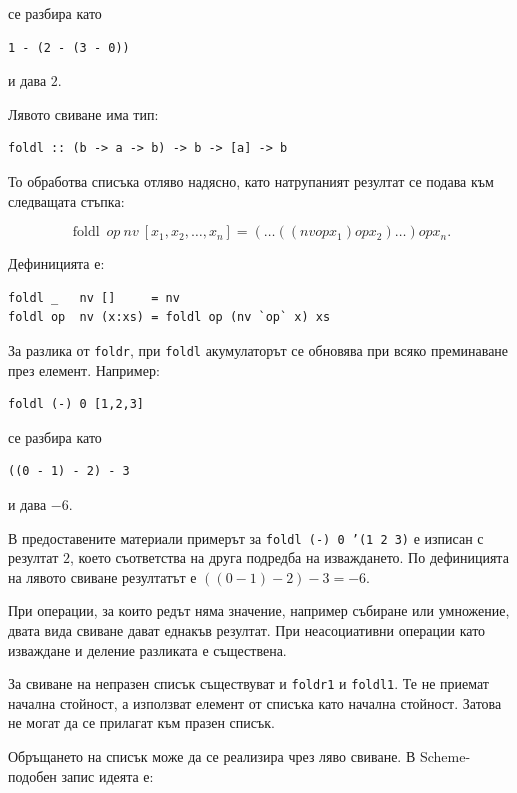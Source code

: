 се разбира като

\begin{verbatim}
1 - (2 - (3 - 0))
\end{verbatim}

и дава $2$.

Лявото свиване има тип:

\begin{verbatim}
foldl :: (b -> a -> b) -> b -> [a] -> b
\end{verbatim}

То обработва списъка отляво надясно, като натрупаният резултат се подава към следващата стъпка:

\[
\operatorname{foldl}\ op\ nv\ [x_1,x_2,\ldots,x_n]
=
(\ldots((nv\mathbin{op}x_1)\mathbin{op}x_2)
\ldots)\mathbin{op}x_n.
\]

Дефиницията е:

\begin{verbatim}
foldl _   nv []     = nv
foldl op  nv (x:xs) = foldl op (nv `op` x) xs
\end{verbatim}

За разлика от \texttt{foldr}, при \texttt{foldl} акумулаторът се обновява при всяко преминаване през елемент. Например:

\begin{verbatim}
foldl (-) 0 [1,2,3]
\end{verbatim}

се разбира като

\begin{verbatim}
((0 - 1) - 2) - 3
\end{verbatim}

и дава $-6$.

\begin{supp}[Бележка]
В предоставените материали примерът за \texttt{foldl (-) 0 '(1 2 3)} е изписан с резултат $2$, което съответства на друга подредба на изваждането. По дефиницията на лявото свиване резултатът е $((0-1)-2)-3=-6$.
\end{supp}

При операции, за които редът няма значение, например събиране или умножение, двата вида свиване дават еднакъв резултат. При неасоциативни операции като изваждане и деление разликата е съществена.

За свиване на непразен списък съществуват и \texttt{foldr1} и \texttt{foldl1}. Те не приемат начална стойност, а използват елемент от списъка като начална стойност. Затова не могат да се прилагат към празен списък.

Обръщането на списък може да се реализира чрез ляво свиване. В Scheme-подобен запис идеята е:

